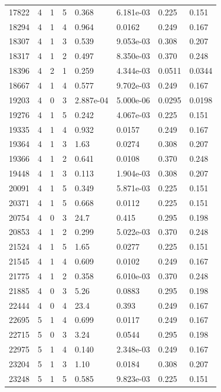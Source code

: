 \documentclass[preview]{standalone}
\begin{document}
{{{\begin{tabular}{L{1.2cm}C{1.2cm} C{0.3cm}C{0.5cm} C{1.4cm}C{1.4cm} C{1.4cm}C{1.4cm}}
  17822  &     4  & 1     &  5 &  0.368  & 6.181e-03  & 0.225 &  0.151   \\ 
  18294  &     4  & 1     &  4 &  0.964  & 0.0162  & 0.249 &  0.167   \\ 
  18307  &     4  & 1     &  3 &  0.539  & 9.053e-03  & 0.308 &  0.207   \\ 
  18317  &     4  & 1     &  2 &  0.497  & 8.350e-03  & 0.370 &  0.248   \\ 
  18396  &     4  & 2     &  1 &  0.259  & 4.344e-03  & 0.0511 &  0.0344   \\ 
  18667  &     4  & 1     &  4 &  0.577  & 9.702e-03  & 0.249 &  0.167   \\ 
  19203  &     4  & 0     &  3 &  2.887e-04  & 5.000e-06  & 0.0295 &  0.0198   \\ 
  19276  &     4  & 1     &  5 &  0.242  & 4.067e-03  & 0.225 &  0.151   \\ 
  19335  &     4  & 1     &  4 &  0.932  & 0.0157  & 0.249 &  0.167   \\ 
  19364  &     4  & 1     &  3 &  1.63  & 0.0274  & 0.308 &  0.207   \\ 
  19366  &     4  & 1     &  2 &  0.641  & 0.0108  & 0.370 &  0.248   \\ 
  19448  &     4  & 1     &  3 &  0.113  & 1.904e-03  & 0.308 &  0.207   \\ 
  20091  &     4  & 1     &  5 &  0.349  & 5.871e-03  & 0.225 &  0.151   \\ 
  20371  &     4  & 1     &  5 &  0.668  & 0.0112  & 0.225 &  0.151   \\ 
  20754  &     4  & 0     &  3 &  24.7  & 0.415  & 0.295 &  0.198   \\ 
  20853  &     4  & 1     &  2 &  0.299  & 5.022e-03  & 0.370 &  0.248   \\ 
  21524  &     4  & 1     &  5 &  1.65  & 0.0277  & 0.225 &  0.151   \\ 
  21545  &     4  & 1     &  4 &  0.609  & 0.0102  & 0.249 &  0.167   \\ 
  21775  &     4  & 1     &  2 &  0.358  & 6.010e-03  & 0.370 &  0.248   \\ 
  21885  &     4  & 0     &  3 &  5.26  & 0.0883  & 0.295 &  0.198   \\ 
  22444  &     4  & 0     &  4 &  23.4  & 0.393  & 0.249 &  0.167   \\ 
  22695  &     5  & 1     &  4 &  0.699  & 0.0117  & 0.249 &  0.167   \\ 
  22715  &     5  & 0     &  3 &  3.24  & 0.0544  & 0.295 &  0.198   \\ 
  22975  &     5  & 1     &  4 &  0.140  & 2.348e-03  & 0.249 &  0.167   \\ 
  23204  &     5  & 1     &  3 &  1.10  & 0.0184  & 0.308 &  0.207   \\ 
  23248  &     5  & 1     &  5 &  0.585  & 9.823e-03  & 0.225 &  0.151   \\ 
\hline 
\end{tabular} 

}}}
\end{document}
